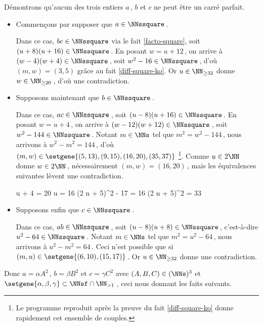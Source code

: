 \medskip
	
Démontrons qu'aucun des trois entiers $a$\,, $b$ et $c$ ne peut être un carré parfait.
%
\begin{itemize}
	\medskip
	\item Commençons par supposer que $a \in \NNssquare$\,. 
		
	\smallskip
	\noindent
	Dans ce cas, $bc \in \NNssquare$ via le fait \ref{facto-square}, soit $(u + 8) (u + 16) \in \NNssquare$\,.
	En posant $w = u + 12$\,, on arrive à $(w - 4) (w + 4) \in \NNssquare$\,, soit $w^2 - 16 \in \NNssquare$\,, d'où $(m, w) = (3, 5)$ grâce au fait \ref{diff-square-ko}.
	Or $u \in \NN_{\geq 32}$ donne $w \in \NN_{\geq 20}$\,, d'où une contradiction.

		
	\medskip
	\item Supposons maintenant que $b \in \NNssquare$\,.
		
	\smallskip
	\noindent
	Dans ce cas, $ac \in \NNssquare$\,, soit $(u - 8) (u + 16) \in \NNssquare$\,.
	En posant $w = u + 4$\,, on arrive à $(w - 12) (w + 12) \in \NNssquare$\,, soit $w^2 - 144 \in \NNssquare$\,.
	Notant $m \in \NNs$ tel que $m^2 = w^2 - 144$\,, nous arrivons à $w^2 - m^2 = 144$\,, d'où $(m, w) \in \setgene{(5, 13) , (9, 15) , (16, 20) , (35, 37)}$
	\footnote{
		Le programme reproduit après la preuve du fait \ref{diff-square-ko} donne rapidement cet ensemble de couples.
	}.
	Comme $u \in 2 \NN$ donne $w \in 2 \NN$\,, nécessairement $(m, w) = (16, 20)$\,, mais les équivalences suivantes lèvent une contradiction.

	\noindent\!\!%
	\begin{stepcalc}[style = sar, ope = \iff]
		u + 4 = 20
	\explnext{}
		u = 16
	\explnext{}
		(2 n + 5)^2 - 17 = 16
	\explnext*{$33 \notin \NNsquare$}{}
		(2 n + 5)^2 = 33
	\end{stepcalc}	
		
		
	\medskip
	\item Supposons enfin que $c \in \NNssquare$\,.
		
	\smallskip
	\noindent
	Dans ce cas, $ab \in \NNssquare$\,, soit $(u - 8) (u + 8) \in \NNssquare$\,, c'est-à-dire $u^2 - 64 \in \NNssquare$\,.
	Notant $m \in \NNs$ tel que $m^2 = u^2 - 64$\,, nous arrivons à $u^2 - m^2 = 64$\,.
	Ceci n'est possible que si $(m, u) \in \setgene{(6, 10), (15, 17)}$\,.
	Or $u \in \NN_{\geq 32}$ donne une contradiction.
\end{itemize}

\medskip

Donc 
$a = \alpha A^2$\,, $b = \beta B^2$ et $c = \gamma C^2$ 
avec $(A, B, C) \in ( \NNs )^3$
et
$\setgene{\alpha, \beta, \gamma} \subset \NNsf \cap \NN_{>1}$\,,
ceci nous donnant les faits suivants.

